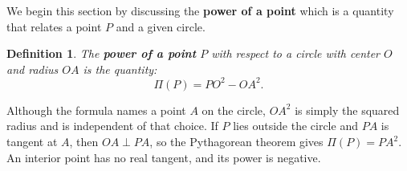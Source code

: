 \documentclass[reqno]{amsart}
\DeclareMathOperator{\1}{\textbf{1}}
\newtheorem{defn}[thm]{Definition}
\begin{document}
We begin this section by discussing the \textbf{power of a point} which is a
quantity that relates a point $P$ and a given circle.

\begin{defn}
    The \textbf{power of a point} $P$ with respect to a circle with center $O$
    and radius $OA$ is the quantity:
    \[
    \Pi(P)=PO^2 - OA^2.
    \]
\end{defn}

Although the formula names a point $A$ on the circle, $OA^2$ is simply the
squared radius and is independent of that choice. If $P$ lies outside the
circle and $PA$ is tangent at $A$, then $OA\perp PA$, so the Pythagorean
theorem gives $\Pi(P)=PA^2$.  An interior point has no real tangent, and its
power is negative.
\vspace{10pt}
\begin{center}
\end{center}
\end{document}
